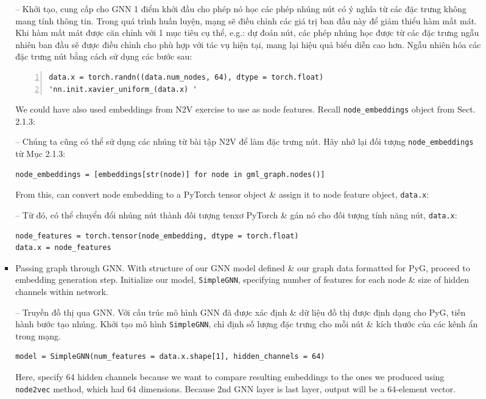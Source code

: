 \documentclass{article}
\begin{document}
\begin{itemize}
\begin{itemize}
\begin{itemize}
\begin{itemize}
               -- Khởi tạo, cung cấp cho GNN 1 điểm khởi đầu cho phép nó học các phép nhúng nút có ý nghĩa từ các đặc trưng không mang tính thông tin. Trong quá trình huấn luyện, mạng sẽ điều chỉnh các giá trị ban đầu này để giảm thiểu hàm mất mát. Khi hàm mất mát được căn chỉnh với 1 mục tiêu cụ thể, e.g.: dự đoán nút, các phép nhúng học được từ các đặc trưng ngẫu nhiên ban đầu sẽ được điều chỉnh cho phù hợp với tác vụ hiện tại, mang lại hiệu quả biểu diễn cao hơn. Ngẫu nhiên hóa các đặc trưng nút bằng cách sử dụng các bước sau:
               \begin{Verbatim}[numbers=left,xleftmargin=5mm]
data.x = torch.randn((data.num_nodes, 64), dtype = torch.float)
'nn.init.xavier_uniform_(data.x) '
               \end{Verbatim}
               We could have also used embeddings from N2V exercise to use as node features. Recall \verb|node_embeddings| object from Sect. 2.1.3:

               -- Chúng ta cũng có thể sử dụng các nhúng từ bài tập N2V để làm đặc trưng nút. Hãy nhớ lại đối tượng \verb|node_embeddings| từ Mục 2.1.3:
               \begin{verbatim}
node_embeddings = [embeddings[str(node)] for node in gml_graph.nodes()]
               \end{verbatim}
               From this, can convert node embedding to a PyTorch tensor object \& assign it to node feature object, {\tt data.x}:

               -- Từ đó, có thể chuyển đổi nhúng nút thành đối tượng tenxơ PyTorch \& gán nó cho đối tượng tính năng nút, {\tt data.x}:
               \begin{verbatim}
node_features = torch.tensor(node_embedding, dtype = torch.float)
data.x = node_features
               \end{verbatim}
               \item {\sf Passing graph through GNN.} With structure of our GNN model defined \& our graph data formatted for PyG, proceed to embedding generation step. Initialize our model, {\tt SimpleGNN}, specifying number of features for each node \& size of hidden channels within network.

               -- {\sf Truyền đồ thị qua GNN.} Với cấu trúc mô hình GNN đã được xác định \& dữ liệu đồ thị được định dạng cho PyG, tiến hành bước tạo nhúng. Khởi tạo mô hình {\tt SimpleGNN}, chỉ định số lượng đặc trưng cho mỗi nút \& kích thước của các kênh ẩn trong mạng.
               \begin{verbatim}
model = SimpleGNN(num_features = data.x.shape[1], hidden_channels = 64)
               \end{verbatim}
               Here, specify 64 hidden channels because we want to compare resulting embeddings to the ones we produced using {\tt node2vec} method, which had 64 dimensions. Because 2nd GNN layer is last layer, output will be a 64-element vector.


\end{itemize}
\end{itemize}
\end{itemize}
\end{itemize}
\end{document}
